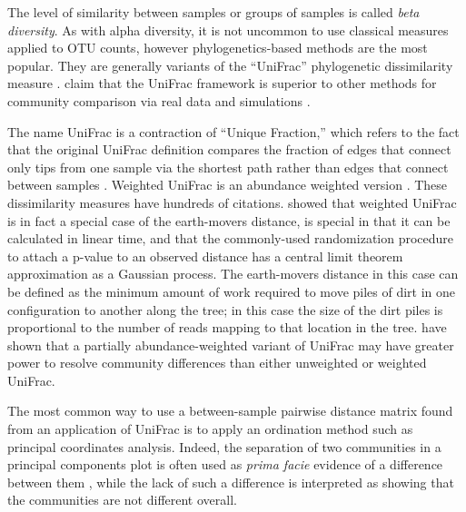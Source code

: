 \documentclass{amsart}
\begin{document}
The level of similarity between samples or groups of samples is called \emph{beta diversity}.
As with alpha diversity, it is not uncommon to use classical measures \citep[e.g.][]{jaccard1908nouvelles} applied to OTU counts, however phylogenetics-based methods are the most popular.
They are generally variants of the ``UniFrac'' phylogenetic dissimilarity measure \citep[as described and named by][]{LozuponeKnightUniFrac05}.
\citet{kuczynski2010microbial} claim that the UniFrac framework is superior to other methods for community comparison via real data and simulations \citep[for a contrary viewpoint using simulations see][]{schloss2008evaluating}.

The name UniFrac is a contraction of ``Unique Fraction,'' which refers to the fact that the original UniFrac definition compares the fraction of edges that connect only tips from one sample via the shortest path rather than edges that connect between samples \citep[Fig.~\ref{fig:unifrac};][]{LozuponeKnightUniFrac05}.
Weighted UniFrac is an abundance weighted version \citep{LozuponeEaWeightedUnifrac07}.
These dissimilarity measures have hundreds of citations.
\citet{evans2012phylogenetic} showed that weighted UniFrac is in fact a special case of the earth-movers distance, is special in that it can be calculated in linear time, and that the commonly-used randomization procedure to attach a p-value to an observed distance has a central limit theorem approximation as a Gaussian process.
The earth-movers distance in this case can be defined as the minimum amount of work required to move piles of dirt in one configuration to another along the tree; in this case the size of the dirt piles is proportional to the number of reads mapping to that location in the tree.
\citet{chen2012associating} have shown that a partially abundance-weighted variant of UniFrac may have greater power to resolve community differences than either unweighted or weighted UniFrac.

The most common way to use a between-sample pairwise distance matrix found from an application of UniFrac is to apply an ordination method such as principal coordinates analysis.
Indeed, the separation of two communities in a principal components plot is often used as \emph{prima facie} evidence of a difference between them
\citep[e.g.][]{lozupone2007global,costello2009bacterial,yatsunenko2012human}, while the lack of such a difference is interpreted as showing that the communities are not different overall.
\end{document}
